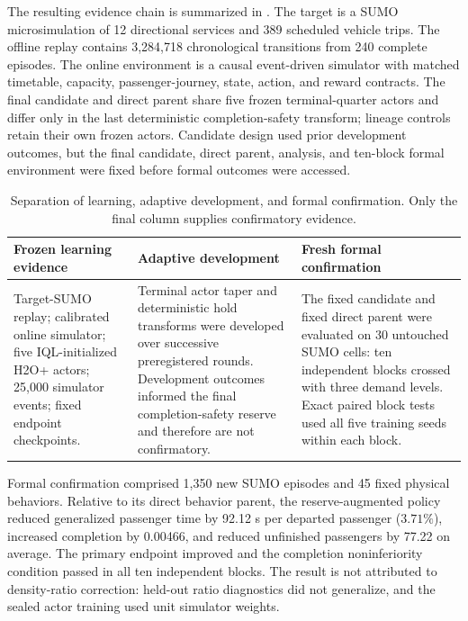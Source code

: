 The resulting evidence chain is summarized in . The
target is a SUMO microsimulation of 12
directional services and 389 scheduled vehicle trips. The offline replay
contains 3,284,718 chronological transitions from 240 complete episodes. The
online environment is a causal event-driven simulator with matched timetable,
capacity, passenger-journey, state, action, and reward contracts. The final
candidate and direct parent share five frozen terminal-quarter actors and differ
only in the last deterministic completion-safety transform; lineage controls
retain their own frozen actors. Candidate design used prior development
outcomes, but the final candidate, direct parent, analysis, and ten-block formal
environment were fixed before formal outcomes were accessed.

\begin{table}[t]
\centering
\small
\caption{Separation of learning, adaptive development, and formal confirmation.
Only the final column supplies confirmatory evidence.}
\label{tab:evidence_chain}
\begin{tabular}{>{\raggedright\arraybackslash}p{}
                >{\raggedright\arraybackslash}p{}
                >{\raggedright\arraybackslash}p{}}
\toprule
\textbf{Frozen learning evidence} & \textbf{Adaptive development} &
\textbf{Fresh formal confirmation} \\
\midrule
Target-SUMO replay; calibrated online simulator; five IQL-initialized H2O+
actors; 25,000 simulator events; fixed endpoint checkpoints. &
Terminal actor taper and deterministic hold transforms were developed over
successive preregistered rounds. Development outcomes informed the final
completion-safety reserve and therefore are not confirmatory. &
The fixed candidate and fixed direct parent were evaluated on 30 untouched
SUMO cells: ten independent blocks crossed with three demand levels. Exact
paired block tests used all five training seeds within each block. \\
\bottomrule
\end{tabular}
\end{table}

Formal confirmation comprised 1,350 new SUMO episodes and 45 fixed physical
behaviors. Relative to its direct behavior parent, the reserve-augmented policy
reduced generalized passenger time by 92.12 s per departed passenger
($3.71\%$), increased completion by 0.00466, and reduced unfinished passengers
by 77.22 on average. The primary endpoint improved and the completion
noninferiority condition passed in all ten independent blocks. The result is
not attributed to density-ratio correction: held-out ratio diagnostics did not
generalize, and the sealed actor training used unit simulator weights.

